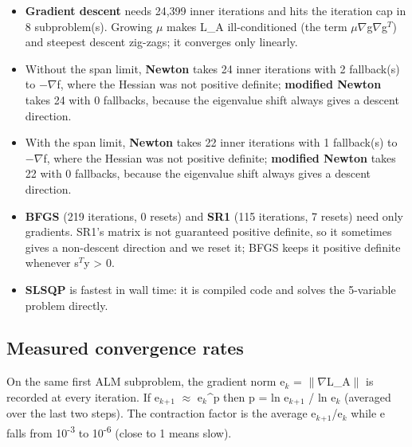 \documentclass[10pt,a4paper]{article}
\begin{document}
\begin{itemize}\setlength{\itemsep}{1pt}
\item \textbf{Gradient descent} needs 24,399 inner iterations and hits the iteration cap in 8 subproblem(s). Growing $\mu$ makes L\_A ill-conditioned (the term $\mu$$\nabla$g$\nabla$g$^T$) and steepest descent zig-zags; it converges only linearly.
\item Without the span limit, \textbf{Newton} takes 24 inner iterations with 2 fallback(s) to $-$$\nabla$f, where the Hessian was not positive definite; \textbf{modified Newton} takes 24 with 0 fallbacks, because the eigenvalue shift always gives a descent direction.
\item With the span limit, \textbf{Newton} takes 22 inner iterations with 1 fallback(s) to $-$$\nabla$f, where the Hessian was not positive definite; \textbf{modified Newton} takes 22 with 0 fallbacks, because the eigenvalue shift always gives a descent direction.
\item \textbf{BFGS} (219 iterations, 0 resets) and \textbf{SR1} (115 iterations, 7 resets) need only gradients. SR1's matrix is not guaranteed positive definite, so it sometimes gives a non-descent direction and we reset it; BFGS keeps it positive definite whenever s$^T$y > 0.
\item \textbf{SLSQP} is fastest in wall time: it is compiled code and solves the 5-variable problem directly.
\end{itemize}
\subsection{Measured convergence rates}
On the same first ALM subproblem, the gradient norm e$_k$ = $\|$$\nabla$L\_A$\|$ is recorded at every iteration. If e$_k$$_+$$_1$ $\approx$ e$_k$\textasciicircum{}p then p = ln e$_k$$_+$$_1$ / ln e$_k$ (averaged over the last two steps). The contraction factor is the average e$_k$$_+$$_1$/e$_k$ while e falls from 10\textsuperscript{-}\textsuperscript{3} to 10\textsuperscript{-}\textsuperscript{6} (close to 1 means slow).
\end{document}
